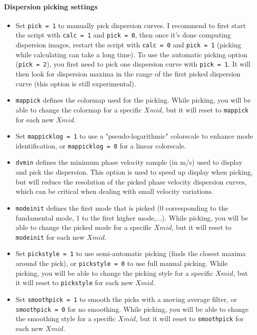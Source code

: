 \documentclass[twoside,a4paper]{article}
\begin{document}
\paragraph{Dispersion picking settings}
\begin{itemize}[leftmargin=*]
\setlength\itemsep{2ex}
\item Set \verb|pick = 1| to manually pick dispersion curves. I recommend to first start the script with \verb|calc = 1| and \verb|pick = 0|, then once it's done computing dispersion images, restart the script with \verb|calc = 0| and \verb|pick = 1| (picking while calculating can take a long time). To use the automatic picking option (\verb|pick = 2|), you first need to pick one dispersion curve with \verb|pick = 1|. It will then look for dispersion maxima in the range of the first picked dispersion curve (this option is still experimental).

\item \verb|mappick| defines the colormap used for the picking. While picking, you will be able to change the colormap for a specific $Xmid$, but it will reset to \verb|mappick| for each new $Xmid$.

\item Set \verb|mappicklog = 1| to use a "pseudo-logarithmic" colorscale to enhance mode identification, or \verb|mappicklog = 0| for a linear colorscale.

\item \verb|dvmin| defines the minimum phase velocity sample (in m/s) used to display and pick the dispersion. This option is used to speed up display when picking, but will reduce the resolution of the picked phase velocity dispersion curves, which can be critical when dealing with small velocity variations.

\item \verb|modeinit| defines the first mode that is picked (0 corresponding to the fundamental mode, 1 to the first higher mode,...). While picking, you will be able to change the picked mode for a specific $Xmid$, but it will reset to \verb|modeinit| for each new $Xmid$.

\item Set \verb|pickstyle = 1| to use semi-automatic picking (finds the closest maxima around the pick), or \verb|pickstyle = 0| to use full manual picking. While picking, you will be able to change the picking style for a specific $Xmid$, but it will reset to \verb|pickstyle| for each new $Xmid$.

\item Set \verb|smoothpick = 1| to smooth the picks with a moving average filter, or \verb|smoothpick = 0| for no smoothing. While picking, you will be able to change the smoothing style for a specific $Xmid$, but it will reset to \verb|smoothpick| for each new $Xmid$.
\end{itemize}
\end{document}
